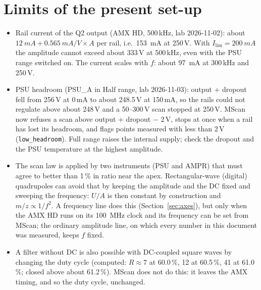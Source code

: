 \documentclass[10pt,a4paper]{article}
\begin{document}
\section{Limits of the present set-up}\label{sec:limits}
\begin{itemize}
\item Rail current of the Q2 output (AMX HD, 500\,kHz, lab 2026-11-02): about
  $\SI{12}{mA} + \SI{0.565}{mA/V}\times A$ per rail, i.e.\ \SI{153}{mA} at 250\,V. With
  $I_\text{lim}=\SI{200}{mA}$ the amplitude cannot exceed about 333\,V at 500\,kHz, even with the PSU
  range switched on. The current scales with $f$: about \SI{97}{mA} at 300\,kHz and 250\,V.
\item PSU headroom (PSU\_A in Half range, lab 2026-11-03): output + dropout fell from 256\,V at 0\,mA
  to about 248.5\,V at 150\,mA, so the rails could not regulate above about 248\,V and a 50--300\,V
  scan stopped at 250\,V. MScan now refuses a scan above output + dropout $-$ 2\,V, stops at once when
  a rail has lost its headroom, and flags points measured with less than 2\,V
  (\texttt{low\_headroom}). Full range raises the internal supply; check the dropout and the PSU
  temperature at the highest amplitude.
\item The scan law is applied by two instruments (PSU and AMPR) that must agree to better than 1\,\%
  in ratio near the apex. Rectangular-wave (digital) quadrupoles can avoid that by keeping the
  amplitude and the DC fixed and sweeping the frequency: $U/A$ is then constant by construction and
  $m/z\propto1/f^2$. A frequency line does this (Section~\ref{sec:axes}), but only when the AMX HD
  runs on its \SI{100}{MHz} clock and its frequency can be set from MScan; the ordinary amplitude
  line, on which every number in this document was measured, keeps $f$ fixed.
\item A filter without DC is also possible with DC-coupled square waves by changing the duty cycle
  (computed: $R\approx7$ at 60.0\,\%, 12 at 60.5\,\%, 41 at 61.0\,\%; closed above about 61.2\,\%).
  MScan does not do this: it leaves the AMX timing, and so the duty cycle, unchanged.
\end{itemize}
\end{document}

